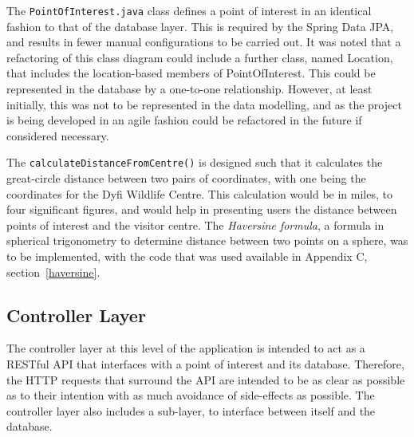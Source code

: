 The \texttt{PointOfInterest.java} class defines a point of interest in an identical fashion to that of the database layer. This is required by the Spring Data JPA, and results in fewer manual configurations to be carried out. It was noted that a refactoring of this class diagram could include a further class, named Location, that includes the location-based members of PointOfInterest. This could be represented in the database by a one-to-one relationship. However, at least initially, this was not to be represented in the data modelling, and as the project is being developed in an agile fashion could be refactored in the future if considered necessary.

The \texttt{calculateDistanceFromCentre()} is designed such that it calculates the great-circle distance between two pairs of coordinates, with one being the coordinates for the Dyfi Wildlife Centre. This calculation would be in miles, to four significant figures, and would help in presenting users the distance between points of interest and the visitor centre. The \textit{Haversine formula}, a formula in spherical trigonometry to determine distance between two points on a sphere, was to be implemented, with the code that was used available in Appendix C, section~\ref{haversine}.

\subsection{Controller Layer}

The controller layer at this level of the application is intended to act as a RESTful API that interfaces with a point of interest and its database. Therefore, the HTTP requests that surround the API are intended to be as clear as possible as to their intention with as much avoidance of side-effects as possible. The controller layer also includes a sub-layer, to interface between itself and the database.

